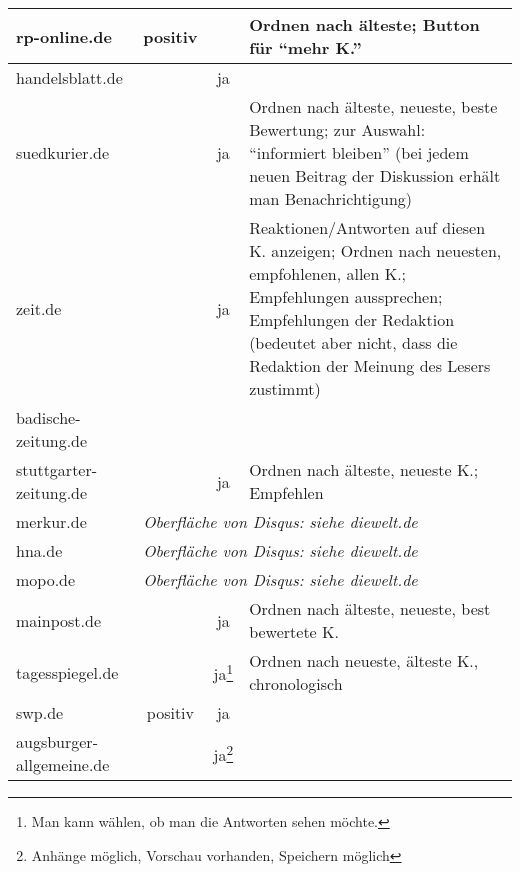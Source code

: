 \begin{landscape}
\begin{longtable}{lccp{100mm}}
rp-online.de
& positiv
&
& Ordnen nach älteste; Button für ``mehr K.''
\\\midrule

handelsblatt.de
&
& ja
&
\\\midrule

suedkurier.de
&
& ja
& Ordnen nach älteste, neueste, beste Bewertung; zur Auswahl: ``informiert
  bleiben'' (bei jedem neuen Beitrag der Diskussion erhält man
  Benachrichtigung)
\\\midrule

zeit.de
&
& ja

& Reaktionen/Antworten auf diesen K. anzeigen; Ordnen nach neuesten,
  empfohlenen, allen K.; Empfehlungen aussprechen; Empfehlungen der Redaktion
  (bedeutet aber nicht, dass die Redaktion der Meinung des Lesers
  zustimmt)
\\\midrule

badische-zeitung.de
&
&
&
\\\midrule

stuttgarter-zeitung.de
&
& ja
& Ordnen nach älteste, neueste K.; Empfehlen
\\\midrule

merkur.de & \multicolumn{3}{l}{\hspace{2cm}\em Oberfläche von Disqus: siehe diewelt.de}
\\\midrule

hna.de & \multicolumn{3}{l}{\hspace{2cm}\em Oberfläche von Disqus: siehe diewelt.de}
\\\midrule

mopo.de & \multicolumn{3}{l}{\hspace{2cm}\em Oberfläche von Disqus: siehe diewelt.de}
\\\midrule

mainpost.de
&
& ja
& Ordnen nach älteste, neueste, best bewertete K.
\\\midrule

tagesspiegel.de
&
& ja\footnote{Man kann wählen, ob man die Antworten sehen möchte.}
& Ordnen nach neueste, älteste K., chronologisch
\\\midrule

swp.de
& positiv
& ja
&
\\\midrule

augsburger-allgemeine.de
&
& ja\footnote{Anhänge möglich, Vorschau vorhanden, Speichern möglich}
&

\end{longtable}
\end{landscape}

